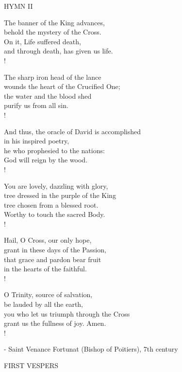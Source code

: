 \noindent\small{\uppercase{Hymn II }}\normalsize\label{holyweek:lastHymn}
\begin{cverse}
The banner of the King advances,\\
behold the mystery of the Cross.\\
On it, Life suffered death,\\
and through death, has given us life.\\!

The sharp iron head of the lance\\
wounds the heart of the Crucified One;\\
the water and the blood shed\\
purify us from all sin.\\!

And thus, the oracle of David is accomplished\\
in his inspired poetry,\\
he who prophesied to the nations:\\
God will reign by the wood.\\!

You are lovely, dazzling with glory,\\
tree dressed in the purple of the King\\
tree chosen from a blessed root.\\
Worthy to touch the sacred Body.\\!

Hail, O Cross, our only hope,\\
grant in these days of the Passion,\\
that grace and pardon bear fruit\\
in the hearts of the faithful.\\!

O Trinity, source of salvation,\\
be lauded by all the earth,\\
you who let us triumph through the Cross\\
grant us the fullness of joy. Amen.\\!
\end{cverse}
\begin{flushright}\tiny - Saint Venance Fortunat (Bishop of Poitiers), 7th century\end{flushright}

\begin{flushleft}\normalsize FIRST VESPERS\\\end{flushleft}

